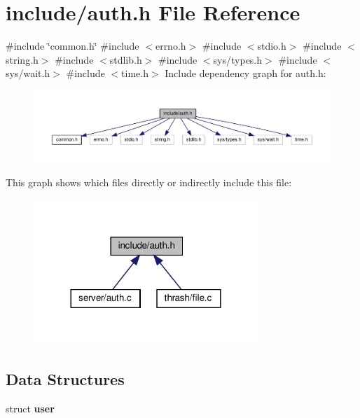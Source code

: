 \section{include/auth.h File Reference}
\label{auth_8h}
{\ttfamily \#include \char`\"{}common.\+h\char`\"{}}\newline
{\ttfamily \#include $<$errno.\+h$>$}\newline
{\ttfamily \#include $<$stdio.\+h$>$}\newline
{\ttfamily \#include $<$string.\+h$>$}\newline
{\ttfamily \#include $<$stdlib.\+h$>$}\newline
{\ttfamily \#include $<$sys/types.\+h$>$}\newline
{\ttfamily \#include $<$sys/wait.\+h$>$}\newline
{\ttfamily \#include $<$time.\+h$>$}\newline
Include dependency graph for auth.\+h\+:\nopagebreak
\begin{figure}[H]
\begin{center}
\leavevmode
\includegraphics[width=350pt]{auth_8h__incl}
\end{center}
\end{figure}
This graph shows which files directly or indirectly include this file\+:\nopagebreak
\begin{figure}[H]
\begin{center}
\leavevmode
\includegraphics[width=240pt]{auth_8h__dep__incl}
\end{center}
\end{figure}
\subsection*{Data Structures}
\begin{DoxyCompactItemize}
\item 
struct \textbf{ user}
\end{DoxyCompactItemize}
